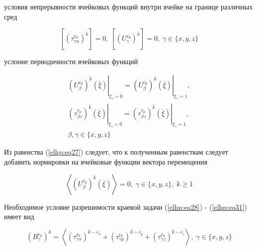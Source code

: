 условия непрерывности ячейковых функций внутри ячейке на границе различных сред

\begin{equation}
    \label{elhp:eq30}
    \left[ \left( \tau_{ \gamma n}^{v_{\theta}} \right)^{ \overline{k} }  \right] = 0
    ,\;
    \left[ \left( U_{ \gamma}^{v_{\theta}} \right)^{ \overline{k} }  \right] = 0
    ,\;
    \gamma \in \{x,y,z\} 
\end{equation}

услоние периодичности ячейковых функций

\begin{equation}
    \label{elhp:eq70}
    \begin{gathered}
    \left.   
    \left( U_{\beta}^{ v_{\theta}} \right)^{ \overline{k}}
    \left( \overline{\xi}  \right) 
    \right|_{\xi_{\gamma}=0}
    =
    \left.   
    \left( U_{\beta}^{ v_{\theta}} \right)^{ \overline{k}}
    \left( \overline{\xi}  \right) 
    \right|_{\xi_{\gamma}=1}
    ,
    \\
    \left.   
    \left( \tau_{\beta\gamma}^{ v_{\theta}} \right)^{ \overline{k}}
    \left( \overline{\xi}  \right) 
    \right|_{\xi_{\gamma}=0}
    =
    \left.   
    \left( \tau_{\beta\gamma}^{ v_{\theta}} \right)^{ \overline{k}}
    \left( \overline{\xi}  \right) 
    \right|_{\xi_{\gamma}=1},
    \\
    \beta,\gamma \in \{x,y,z\} 
    \end{gathered}
\end{equation}

Из равенства 
(\ref{elhp:eq27})
следует, что к полученным равенствам следует добавить нормировки на 
ячейковые функции вектора перемещения

\begin{equation}
    \label{elhp:eq31}
    \left< \left( U_{\beta}^{v_{\theta}} \right)^{ \overline{k} } \left( \overline{\xi}  \right)   \right> = 0
    ,\;
    \gamma \in \{x,y,z\} ,\; k \ge 1
\end{equation}


Необходимое условие разрешимости краевой задачи 
(\ref{elhp:eq28})
-
(\ref{elhp:eq31})
имеет вид

\begin{equation}
    \label{elhp:eq32}
    \left( B_{\gamma}^{v_{\theta}} \right)^{ \overline{k} } =
    \left< 
    \left( \tau_{ \gamma x}^{v_{\theta}} \right)^{ \overline{k} - \overline{\epsilon_x} } +
    \left( \tau_{ \gamma y}^{v_{\theta}} \right)^{ \overline{k} - \overline{\epsilon_y} } +
    \left( \tau_{ \gamma z}^{v_{\theta}} \right)^{ \overline{k} - \overline{\epsilon_z} } 
    \right> 
    ,\;
    \gamma \in \{x,y,z\} 
\end{equation}

